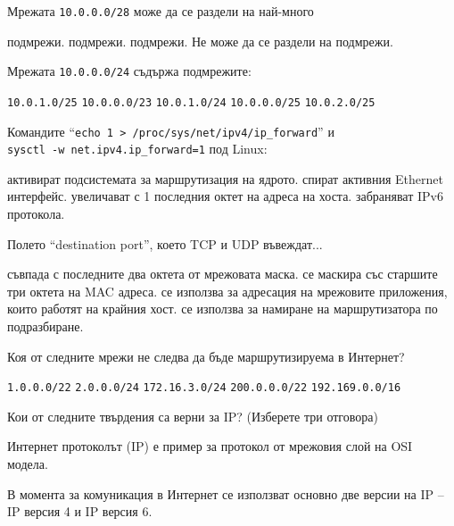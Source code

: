 \begin{questions}
  \question[10] Мрежата \texttt{10.0.0.0/28} може да се раздели на най-много
  \begin{choices}
     подмрежи.
     подмрежи.
     подмрежи.
    \choice Не може да се раздели на подмрежи.
  \end{choices}

  \question[10] Мрежата \texttt{10.0.0.0/24} съдържа подмрежите:
  \begin{oneparchoices}
    \choice \texttt{10.0.1.0/25}
    \choice \texttt{10.0.0.0/23}
    \choice \texttt{10.0.1.0/24}
    \CorrectChoice \texttt{10.0.0.0/25}
    \choice \texttt{10.0.2.0/25}
  \end{oneparchoices}

  \question[6] Командите "`\texttt{echo 1 > /proc/sys/net/ipv4/ip\_forward}"' и \\
  \texttt{sysctl -w net.ipv4.ip\_forward=1} под Linux:
  \begin{choices}
    \CorrectChoice активират подсистемата за маршрутизация на ядрото.
    \choice спират активния Ethernet интерфейс.
    \choice увеличават с 1 последния октет на адреса на хоста.
    \choice забраняват IPv6 протокола.
  \end{choices}

  \question[6] Полето "`\foreignlanguage{english}{destination port}"', което TCP
  и UDP въвеждат...
  \begin{choices}
    \choice съвпада с последните два октета от мрежовата маска.
    \choice се маскира със старшите три октета на MAC адреса.
    \CorrectChoice се използва за адресация на мрежовите приложения, които
    работят на крайния хост.
    \choice се използва за намиране на маршрутизатора по подразбиране.
  \end{choices}

  \question[6] Коя от следните мрежи не следва да бъде маршрутизируема в Интернет?
  \begin{choices}
    \choice \texttt{1.0.0.0/22}
    \choice \texttt{2.0.0.0/24}
    \CorrectChoice \texttt{172.16.3.0/24}
    \choice \texttt{200.0.0.0/22}
    \choice \texttt{192.169.0.0/16}
  \end{choices}

  \question[6] Кои от следните твърдения са верни за IP? (Изберете три отговора)
  \begin{choices}
    \CorrectChoice Интернет протоколът (IP) е пример за протокол от мрежовия
    слой на OSI модела.

    \CorrectChoice В момента за комуникация в Интернет се използват основно две
    версии на IP – IP версия 4 и IP версия 6.


\end{choices}
\end{questions}
